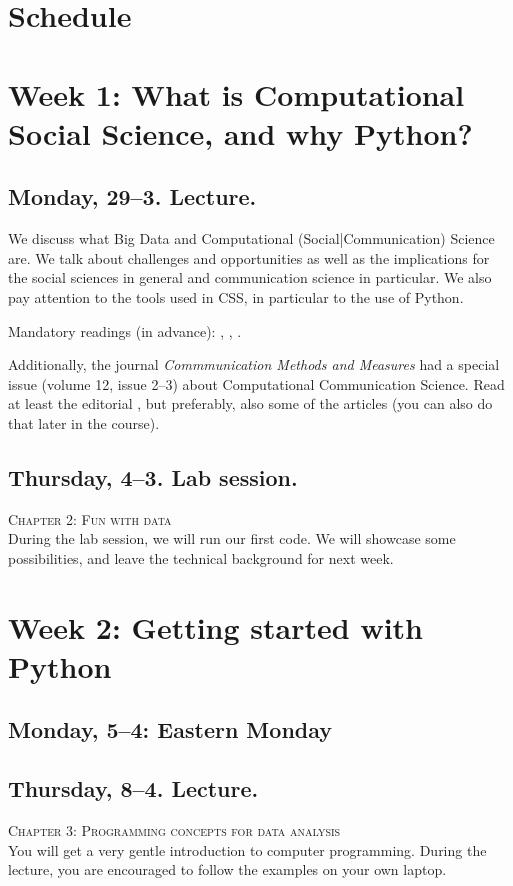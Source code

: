 \section*{Schedule}

\section*{Week 1: What is Computational Social Science, and why Python?}
\subsection*{Monday, 29--3. Lecture.}
We discuss what Big Data and Computational (Social|Communication) Science are. We talk about challenges and opportunities as well as the implications for the social sciences in general and communication science in particular. We also pay attention to the tools used in CSS, in particular to the use of Python.

Mandatory readings (in advance):  \cite{boyd2012}, \cite{Kitchin2014}, \cite{Hilbert2019}.

Additionally, the journal \textit{Commmunication Methods and Measures} had a special issue (volume 12, issue 2--3) about Computational Communication Science. Read at least the editorial \citep{VanAtteveldt2018a}, but preferably, also some of the articles (you can also do that later in the course).


\subsection*{Thursday, 4--3. Lab session.}
\textsc{ Chapter 2: Fun with data}\\

During the lab session, we will run our first code. We will showcase some possibilities, and leave the technical background for next week.

\section*{Week 2: Getting started with Python  }

\subsection*{Monday, 5--4: Eastern Monday}

\subsection*{Thursday, 8--4. Lecture.}
\textsc{ Chapter 3: Programming concepts for data analysis}\\
You will get a very gentle introduction to computer programming. During the lecture, you are encouraged to follow the examples on your own laptop.


